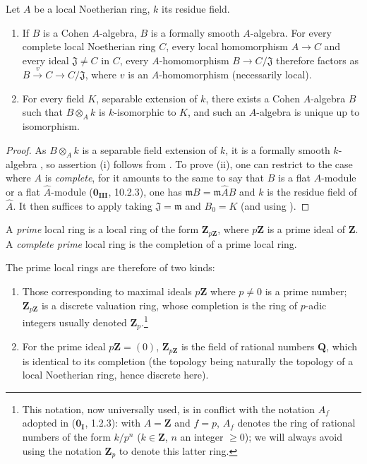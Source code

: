 \begin{theorem}[19.8.2]
\label{0.19.8.2}
Let $A$ be a local Noetherian ring, $k$ its residue field.
\begin{enumerate}
  \item[\rm(i)] If $B$ is a Cohen $A$-algebra, $B$ is a formally smooth $A$-algebra.
For every complete local Noetherian ring $C$, every local homomorphism $A\to C$ and every ideal $\mathfrak{J}\neq C$ in $C$, every $A$-homomorphism $B\to C/\mathfrak{J}$ therefore factors as $B\xrightarrow{v}C\to C/\mathfrak{J}$, where $v$ is an $A$-homomorphism (necessarily local).
  \item[\rm(ii)] For every field $K$, separable extension of $k$, there exists a Cohen $A$-algebra $B$ such that $B\otimes_A k$ is $k$-isomorphic to $K$, and such an $A$-algebra is unique up to isomorphism.
\end{enumerate}
\end{theorem}

\begin{proof}
As $B\otimes_A k$ is a separable field extension of $k$, it is a formally smooth $k$-algebra , so assertion (i) follows from .
To prove (ii), one can restrict to the case where $A$ is \emph{complete}, for it amounts to the same to say that $B$ is a flat $A$-module or a flat $\widehat{A}$-module ($\mathbf{0_{III}}$, 10.2.3), one has $\mathfrak{m}B=\mathfrak{m}\widehat{A}B$ and $k$ is the residue field of $\widehat{A}$.
It then suffices to apply  taking $\mathfrak{J}=\mathfrak{m}$ and $B_0=K$ (and using ).
\end{proof}

\begin{definition}[19.8.3]
\label{0.19.8.3}
A \emph{prime} local ring is a local ring of the form $\mathbf{Z}_{p\mathbf{Z}}$, where $p\mathbf{Z}$ is a prime ideal of $\mathbf{Z}$.
A \emph{complete prime} local ring is the completion of a prime local ring.
\end{definition}

The prime local rings are therefore of two kinds:
\begin{enumerate}
  \item[$1^\circ$] Those corresponding to maximal ideals $p\mathbf{Z}$ where $p\neq 0$ is a prime number; $\mathbf{Z}_{p\mathbf{Z}}$ is a discrete valuation ring, whose completion is the ring of $p$-adic integers usually denoted $\mathbf{Z}_p$.\footnote{This notation, now universally used, is in conflict with the notation $A_f$ adopted in ($\mathbf{0_I}$, 1.2.3): with $A=\mathbf{Z}$ and $f=p$, $A_f$ denotes the ring of rational numbers of the form $k/p^n$ ($k\in\mathbf{Z}$, $n$ an integer $\geq 0$); we will always avoid using the notation $\mathbf{Z}_p$ to denote this latter ring.}
  \item[$2^\circ$] For the prime ideal $p\mathbf{Z}=(0)$, $\mathbf{Z}_{p\mathbf{Z}}$ is the field of rational numbers $\mathbf{Q}$, which is identical to its completion (the topology being naturally the topology of a local Noetherian ring, hence discrete here).
\end{enumerate}

